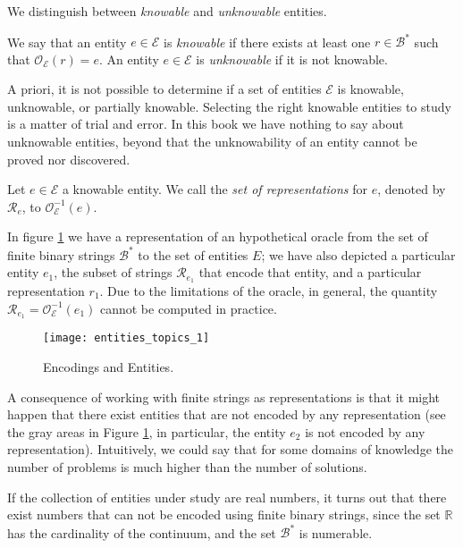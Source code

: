 We distinguish between \emph{knowable} and \emph{unknowable} entities.

\begin{definition}
We say that an entity $e \in \mathcal{E}$ is \emph{knowable} if there exists at least one $r \in \mathcal{B}^\ast$ such that $\mathcal{O}_\mathcal{E}(r) = e$. An entity $e \in \mathcal{E}$ is \emph{unknowable} if it is not knowable.
\end{definition}

A priori, it is not possible to determine if a set of entities $\mathcal{E}$ is knowable, unknowable, or partially knowable. Selecting the right knowable entities to study is a matter of trial and error. In this book we have nothing to say about unknowable entities, beyond that the unknowability of an entity cannot be proved nor discovered.

\begin{definition}
Let $e \in \mathcal{E}$ a knowable entity. We call the \emph{set of representations} for $e$, denoted by $\mathcal{R}_e$, to $\mathcal{O}_\mathcal{E}^{-1} (e)$.
\end{definition}

In figure \ref{fig:entities_topics_1} we have a representation of an hypothetical oracle from the set of finite binary strings $\mathcal{B}^\ast$ to the set of entities $E$; we have also depicted a particular entity $e_1$, the subset of strings $\mathcal{R}_{e_1}$ that encode that entity, and a particular representation $r_1$. Due to the limitations of the oracle, in general, the quantity $\mathcal{R}_{e_1} = \mathcal{O}_\mathcal{E}^{-1}(e_1)$ cannot be computed in practice.

\begin{figure}[h]
\centering\texttt{[image: entities\_topics\_1]}
\caption{\label{fig:entities_topics_1}Encodings and Entities.}
\end{figure}

A consequence of working with finite strings as representations is that it might happen that there exist entities that are not encoded by any representation (see the gray areas in Figure \ref{fig:entities_topics_1}, in particular, the entity $e_2$ is not encoded by any representation). Intuitively, we could say that for some domains of knowledge the number of problems is much higher than the number of solutions.

\begin{example}
If the collection of entities under study are real numbers, it turns out that there exist numbers that can not be encoded using finite binary strings, since the set $\mathbb{R}$ has the cardinality of the continuum, and the set $\mathcal{B}^\ast$ is numerable.
\end{example}

